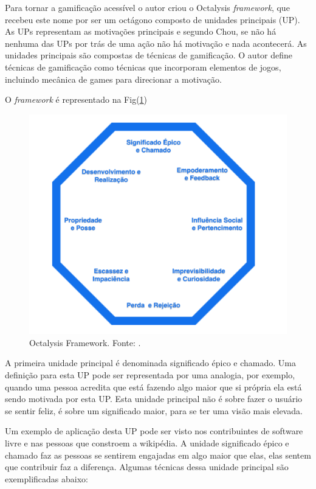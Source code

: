 Para tornar a gamificação acessível o autor criou o Octalysis \textit{framework}, que recebeu este nome por ser um octágono composto de unidades principais (UP). As UPs representam as motivações principais e segundo Chou, se não há nenhuma das UPs por trás de uma ação não há motivação e nada acontecerá. As unidades principais são compostas de técnicas de gamificação. O autor define técnicas de gamificação como técnicas que incorporam elementos de jogos, incluindo mecânica de games para direcionar a motivação.

 O \textit{framework} é representado na Fig(\ref{octfig})

\begin{figure}[h]
	\centering
		\includegraphics[keepaspectratio=true,scale=0.5]{figuras/octfig.png}
	\caption{Octalysis Framework. Fonte:  \cite{chou2015actionable}.\label{octfig}
}
\end{figure}

\newpage

A primeira unidade principal é denominada significado épico e chamado. Uma definição para esta UP pode ser representada por uma analogia, por exemplo, quando uma pessoa acredita que está fazendo algo maior que si própria ela está sendo motivada por esta UP. Esta unidade principal não é sobre fazer o usuário se sentir feliz, é sobre um significado maior, para se ter uma visão mais elevada. 

Um exemplo de aplicação desta UP pode ser visto nos contribuintes de software livre e nas pessoas que constroem a wikipédia. A unidade significado épico e chamado faz as pessoas se sentirem engajadas em algo maior que elas, elas sentem que contribuir faz a diferença. Algumas técnicas dessa unidade principal são exemplificadas abaixo:

